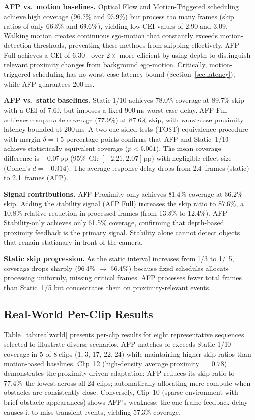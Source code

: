 \documentclass[conference]{IEEEtran}
\begin{document}
\textbf{AFP vs.\ motion baselines.} Optical Flow and
Motion-Triggered scheduling achieve high coverage (96.3\% and
93.9\%) but process too many frames (skip ratios of only 66.8\% and
69.6\%), yielding low CEI values of 2.90 and 3.09. Walking motion
creates continuous ego-motion that constantly exceeds
motion-detection thresholds, preventing these methods from skipping
effectively. AFP Full achieves a CEI of 6.30---over $2\times$ more
efficient by using depth to distinguish relevant proximity changes
from background ego-motion. Critically, motion-triggered scheduling
has no worst-case latency bound (Section~\ref{sec:latency}), while
AFP guarantees 200\,ms.

\textbf{AFP vs.\ static baselines.} Static 1/10 achieves 78.0\%
coverage at 89.7\% skip with a CEI of 7.60, but imposes a fixed
900\,ms worst-case delay. AFP Full achieves comparable coverage
(77.9\%) at 87.6\% skip, with worst-case proximity latency bounded
at 200\,ms. A two one-sided tests (TOST) equivalence procedure
with margin $\delta{=}{\pm}5$ percentage points confirms that AFP
and Static~1/10 achieve statistically equivalent coverage
($p < 0.001$). The mean coverage difference is $-0.07$\,pp
(95\%~CI: $[-2.21, 2.07]$\,pp) with negligible effect size
(Cohen's $d = -0.014$). The average response delay drops from
2.4~frames (static) to 2.1~frames (AFP).

\textbf{Signal contributions.} AFP Proximity-only achieves 81.4\%
coverage at 86.2\% skip. Adding the stability signal (AFP Full)
increases the skip ratio to 87.6\%, a 10.8\% relative reduction in
processed frames (from 13.8\% to 12.4\%). AFP Stability-only
achieves only 61.5\% coverage, confirming that depth-based proximity
feedback is the primary signal. Stability alone cannot detect
objects that remain stationary in front of the camera.

\textbf{Static skip progression.} As the static interval increases
from 1/3 to 1/15, coverage drops sharply (96.4\% $\to$ 56.4\%)
because fixed schedules allocate processing uniformly, missing
critical frames. AFP processes fewer total frames than Static~1/5
but concentrates them on proximity-relevant events.

\subsection{Real-World Per-Clip Results}

Table~\ref{tab:realworld} presents per-clip results for eight
representative sequences selected to illustrate diverse scenarios.
AFP matches or exceeds Static 1/10 coverage in 5 of 8 clips (1, 3,
17, 22, 24) while maintaining higher skip ratios than motion-based
baselines. Clip~12 (high-density, average proximity~$= 0.78$)
demonstrates the proximity-driven adaptation: AFP reduces its skip
ratio to 77.4\%--the lowest across all 24 clips; automatically
allocating more compute when obstacles are consistently close.
Conversely, Clip~10 (sparse environment with brief obstacle
appearances) shows AFP's weakness: the one-frame feedback delay
causes it to miss transient events, yielding 57.3\% coverage.
\end{document}

